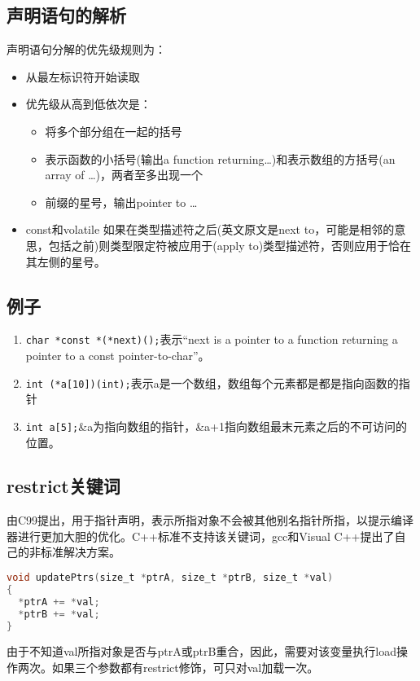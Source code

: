 \subsection{声明语句的解析}
声明语句分解的优先级规则为：
\begin{itemize}
    \item 从最左标识符开始读取
    \item 优先级从高到低依次是：
        \begin{itemize}
            \item 将多个部分组在一起的括号
            \item 表示函数的小括号(输出a function returning\dots)和表示数组的方括号(an array of \dots)，两者至多出现一个
            \item 前缀的星号，输出pointer to \dots
        \end{itemize}
    \item const和volatile 如果在类型描述符之后(英文原文是next to，可能是相邻的意思，包括之前)则类型限定符被应用于(apply to)类型描述符，否则应用于恰在其左侧的星号。
\end{itemize}

\subsection{例子}
\begin{enumerate}
    \item \verb|char *const *(*next)();|表示``next is a pointer to a function returning a pointer to a const pointer-to-char''。
    \item \verb|int (*a[10])(int);|表示a是一个数组，数组每个元素都是都是指向函数的指针
    \item \verb|int a[5];|\&a为指向数组的指针，\&a+1指向数组最末元素之后的不可访问的位置。
\end{enumerate}

\subsection{restrict关键词}
由C99提出，用于指针声明，表示所指对象不会被其他别名指针所指，以提示编译器进行更加大胆的优化。C++标准不支持该关键词，gcc和Visual C++提出了自己的非标准解决方案。

\begin{lstlisting}[language=C]
void updatePtrs(size_t *ptrA, size_t *ptrB, size_t *val)
{
  *ptrA += *val;
  *ptrB += *val;
}
\end{lstlisting}

由于不知道val所指对象是否与ptrA或ptrB重合，因此，需要对该变量执行load操作两次。如果三个参数都有restrict修饰，可只对val加载一次。

